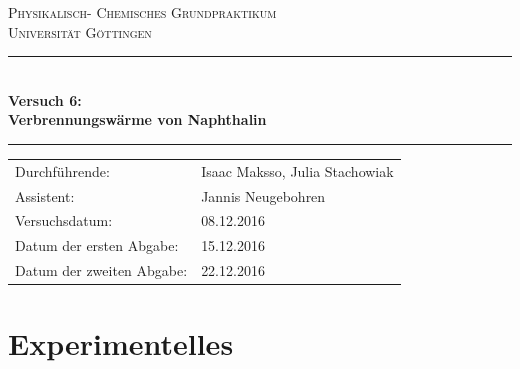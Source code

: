\documentclass[12pt,a4paper,titlepage,headinclude,bibtotoc]{scrartcl}
\begin{document}
\begin{titlepage}
\centering
\textsc{\Large Physikalisch- Chemisches Grundpraktikum\\[1.5ex] Universität Göttingen}

\vspace*{0.5cm}

\rule{\textwidth}{1pt}\\[0.5cm]
{\huge \bfseries
  Versuch 6: \\[1.5ex]
  Verbrennungswärme von Naphthalin}\\[0.5cm]
\rule{\textwidth}{1pt}

\vspace*{0.5cm}

\begin{Large}
\begin{tabular}{ll}
Durchführende: &  Isaac Maksso, Julia Stachowiak\\
Assistent: & Jannis Neugebohren\\
Versuchsdatum: & 08.12.2016\\
Datum der ersten Abgabe: & 15.12.2016\\
Datum der zweiten Abgabe: & 22.12.2016\\
\end{tabular}
\end{Large}

\vspace*{0.5cm}

\vspace{1.3cm} 
\end{titlepage}


\tableofcontents %
\newpage
 
 \section{Experimentelles}
\end{document}
